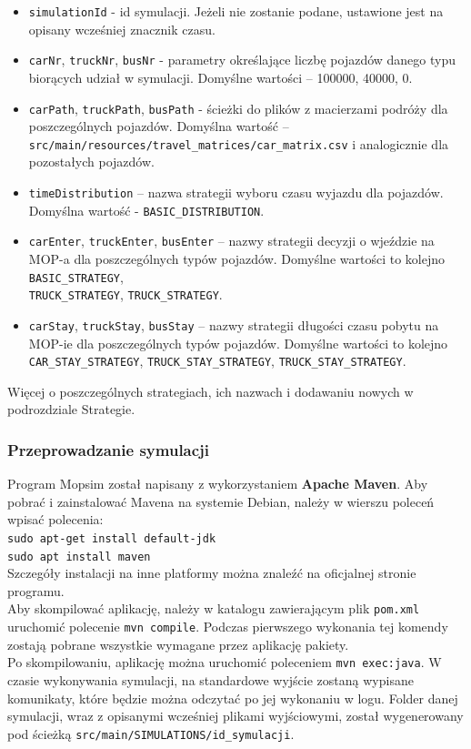 \begin{itemize}
\item \texttt{simulationId} - id symulacji. Jeżeli nie zostanie podane, ustawione jest na opisany wcześniej znacznik czasu.
\item \texttt{carNr}, \texttt{truckNr}, \texttt{busNr} - parametry określające liczbę pojazdów danego typu biorących udział w symulacji. Domyślne wartości -- 100000, 40000, 0.
\item \texttt{carPath}, \texttt{truckPath}, \texttt{busPath} - ścieżki do plików z macierzami podróży dla poszczególnych pojazdów. Domyślna wartość -- \\\texttt{src/main/resources/travel\_matrices/car\_matrix.csv} i analogicznie dla pozostałych pojazdów.
\item \texttt{timeDistribution} -- nazwa strategii wyboru czasu wyjazdu dla pojazdów. Domyślna wartość - \texttt{BASIC\_DISTRIBUTION}.
\item \texttt{carEnter}, \texttt{truckEnter}, \texttt{busEnter} -- nazwy strategii decyzji o wjeździe na MOP-a dla poszczególnych typów pojazdów. Domyślne wartości to kolejno \texttt{BASIC\_STRATEGY}, \\\texttt{TRUCK\_STRATEGY}, \texttt{TRUCK\_STRATEGY}.
\item \texttt{carStay}, \texttt{truckStay}, \texttt{busStay} -- nazwy strategii długości czasu pobytu na MOP-ie dla poszczególnych typów pojazdów. Domyślne wartości to kolejno \texttt{CAR\_STAY\_STRATEGY}, \texttt{TRUCK\_STAY\_STRATEGY}, \texttt{TRUCK\_STAY\_STRATEGY}.
\end{itemize}
Więcej o poszczególnych strategiach, ich nazwach i dodawaniu nowych w podrozdziale Strategie.
\subsubsection{Przeprowadzanie symulacji}
Program Mopsim został napisany z wykorzystaniem \textbf{Apache Maven}. Aby pobrać i zainstalować Mavena na systemie Debian, należy w wierszu poleceń wpisać polecenia:\\
\texttt{sudo apt-get install default-jdk}\\
\texttt{sudo apt install maven}\\
Szczegóły instalacji na inne platformy można znaleźć na oficjalnej stronie programu.\\
Aby skompilować aplikację, należy w katalogu zawierającym plik \texttt{pom.xml} uruchomić polecenie \texttt{mvn compile}. Podczas pierwszego wykonania tej komendy zostają pobrane wszystkie wymagane przez aplikację pakiety.\\
Po skompilowaniu, aplikację można uruchomić poleceniem \texttt{mvn exec:java}. W czasie wykonywania symulacji, na standardowe wyjście zostaną wypisane komunikaty, które będzie można odczytać po jej wykonaniu w logu. Folder danej symulacji, wraz z opisanymi wcześniej plikami wyjściowymi, został wygenerowany pod ścieżką \texttt{src/main/SIMULATIONS/id\_symulacji}.
